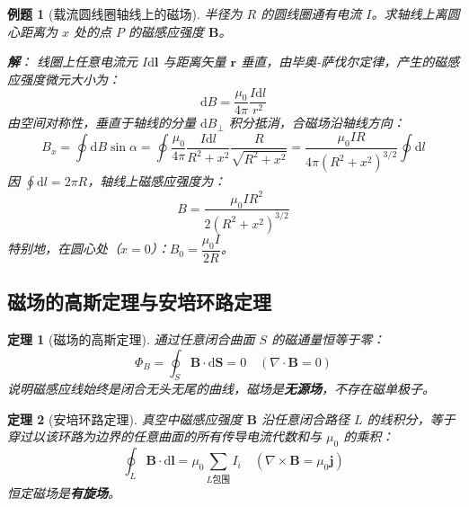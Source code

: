 \documentclass[11pt,a4paper,fontset=fandol]{ctexart}
\newtheorem{theorem}{定理}[section]
\newtheorem{example}{例题}[section]
\theoremstyle{remark}
\begin{document}
\begin{example}[载流圆线圈轴线上的磁场]
半径为 $R$ 的圆线圈通有电流 $I$。求轴线上离圆心距离为 $x$ 处的点 $P$ 的磁感应强度 $\bm{B}$。

\textbf{解}：
线圈上任意电流元 $I\mathrm{d}\bm{l}$ 与距离矢量 $\bm{r}$ 垂直，由毕奥-萨伐尔定律，产生的磁感应强度微元大小为：
\begin{equation*}
    \mathrm{d}B = \frac{\mu_0}{4\pi}\frac{I\mathrm{d}l}{r^2}
\end{equation*}
由空间对称性，垂直于轴线的分量 $\mathrm{d}B_\perp$ 积分抵消，合磁场沿轴线方向：
\begin{equation*}
    B_x = \oint \mathrm{d}B \sin\alpha = \oint \frac{\mu_0}{4\pi}\frac{I\mathrm{d}l}{R^2+x^2} \frac{R}{\sqrt{R^2+x^2}} = \frac{\mu_0 I R}{4\pi (R^2+x^2)^{3/2}} \oint \mathrm{d}l
\end{equation*}
因 $\oint \mathrm{d}l = 2\pi R$，轴线上磁感应强度为：
\begin{equation}
    B = \frac{\mu_0 I R^2}{2(R^2+x^2)^{3/2}}
\end{equation}
特别地，在圆心处（$x=0$）：$B_0 = \dfrac{\mu_0 I}{2R}$。
\end{example}

\subsection{磁场的高斯定理与安培环路定理}

\begin{theorem}[磁场的高斯定理]
通过任意闭合曲面 $S$ 的磁通量恒等于零：
\begin{equation}
    \Phi_B = \oint_S \bm{B} \cdot \mathrm{d}\bm{S} = 0 \quad (\nabla \cdot \bm{B} = 0)
\end{equation}
说明磁感应线始终是闭合无头无尾的曲线，磁场是\textbf{无源场}，不存在磁单极子。
\end{theorem}

\begin{theorem}[安培环路定理]
真空中磁感应强度 $\bm{B}$ 沿任意闭合路径 $L$ 的线积分，等于穿过以该环路为边界的任意曲面的所有传导电流代数和与 $\mu_0$ 的乘积：
\begin{equation}
    \oint_L \bm{B} \cdot \mathrm{d}\bm{l} = \mu_0 \sum_{L\text{包围}} I_i \quad (\nabla \times \bm{B} = \mu_0 \bm{j})
\end{equation}
恒定磁场是\textbf{有旋场}。
\end{theorem}
\end{document}
